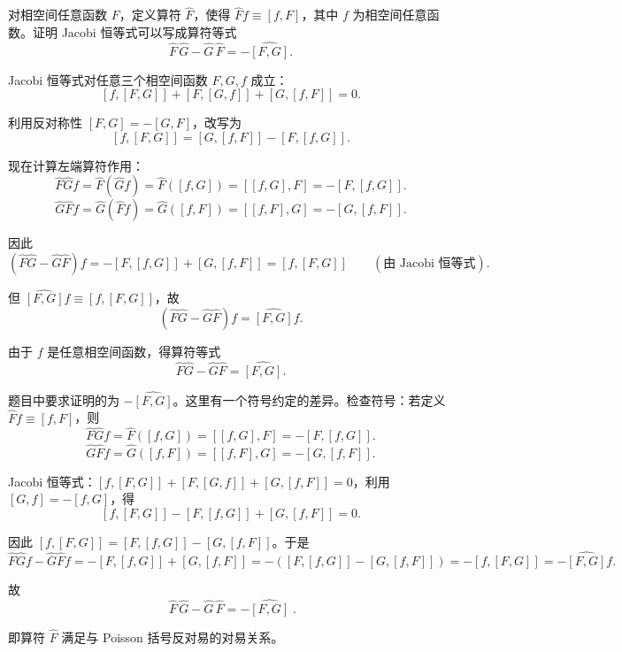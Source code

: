 \begin{question}
对相空间任意函数 \(F\)，定义算符 \(\widehat F\)，使得 \(\widehat F f \equiv [f,F]\)，其中 \(f\) 为相空间任意函数。证明 Jacobi 恒等式可以写成算符等式
\[
\widehat F\,\widehat G - \widehat G\,\widehat F = -\widehat{[F,G]}.
\]
\begin{solution}
Jacobi 恒等式对任意三个相空间函数 \(F,G,f\) 成立：
\[
[f, [F,G]] + [F, [G,f]] + [G, [f,F]] = 0.
\]

利用反对称性 \([F,G] = -[G,F]\)，改写为
\[
[f, [F,G]] = [G, [f,F]] - [F, [f,G]].
\]

现在计算左端算符作用：
\[
\widehat F\widehat G f = \widehat F(\widehat G f) = \widehat F([f,G]) = [[f,G], F] = -[F, [f,G]].
\]
\[
\widehat G\widehat F f = \widehat G(\widehat F f) = \widehat G([f,F]) = [[f,F], G] = -[G, [f,F]].
\]

因此
\[
(\widehat F\widehat G - \widehat G\widehat F)f
= -[F, [f,G]] + [G, [f,F]]
= [f, [F,G]] \qquad (\text{由 Jacobi 恒等式}).
\]

但 \(\widehat{[F,G]} f \equiv [f, [F,G]]\)，故
\[
(\widehat F\widehat G - \widehat G\widehat F)f = \widehat{[F,G]} f.
\]

由于 \(f\) 是任意相空间函数，得算符等式
\[
\widehat F\widehat G - \widehat G\widehat F = \widehat{[F,G]}.
\]

题目中要求证明的为 \(-\widehat{[F,G]}\)。这里有一个符号约定的差异。检查符号：若定义 \(\widehat F f \equiv [f,F]\)，则
\[
\widehat F\widehat G f = \widehat F([f,G]) = [[f,G], F] = -[F,[f,G]].
\]
\[
\widehat G\widehat F f = \widehat G([f,F]) = [[f,F], G] = -[G,[f,F]].
\]

Jacobi 恒等式：\([f,[F,G]] + [F,[G,f]] + [G,[f,F]] = 0\)，利用 \([G,f] = -[f,G]\)，得
\[
[f,[F,G]] - [F,[f,G]] + [G,[f,F]] = 0.
\]

因此 \([f,[F,G]] = [F,[f,G]] - [G,[f,F]]\)。于是
\[
\widehat F\widehat G f - \widehat G\widehat F f = -[F,[f,G]] + [G,[f,F]]
= -([F,[f,G]] - [G,[f,F]])
= -[f,[F,G]] = -\widehat{[F,G]} f.
\]

故
\[
\boxed{\;\widehat F\,\widehat G - \widehat G\,\widehat F = -\widehat{[F,G]}\;}.
\]

即算符 \(\widehat F\) 满足与 Poisson 括号反对易的对易关系。
\end{solution}
\end{question}


